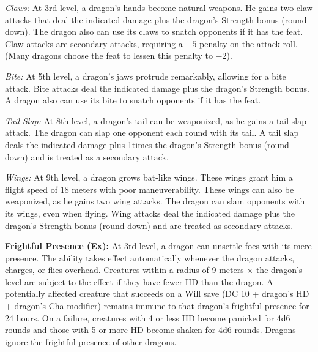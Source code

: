 {

\textit{Claws:} At 3rd level, a dragon's hands become natural weapons. He gains two claw attacks that deal the indicated damage plus \onehalf the dragon's Strength bonus (round down). The dragon also can use its claws to snatch opponents if it has the  feat. Claw attacks are secondary attacks, requiring a $-5$ penalty on the attack roll. (Many dragons choose the  feat to lessen this penalty to $-2$).

\textit{Bite:} At 5th level, a dragon's jaws protrude remarkably, allowing for a bite attack. Bite attacks deal the indicated damage plus the dragon's Strength bonus. A dragon also can use its bite to snatch opponents if it has the  feat.

\textit{Tail Slap:} At 8th level, a dragon's tail can be weaponized, as he gains a tail slap attack. The dragon can slap one opponent each round with its tail. A tail slap deals the indicated damage plus 1\onehalf times the dragon's Strength bonus (round down) and is treated as a secondary attack.

\textit{Wings:} At 9th level, a dragon grows bat-like wings. These wings grant him a flight speed of 18 meters with poor maneuverability. These wings can also be weaponized, as he gains two wing attacks. The dragon can slam opponents with its wings, even when flying. Wing attacks deal the indicated damage plus \onehalf the dragon's Strength bonus (round down) and are treated as secondary attacks.

\textbf{Frightful Presence (Ex):} At 3rd level, a dragon can unsettle foes with its mere presence. The ability takes effect automatically whenever the dragon attacks, charges, or flies overhead. Creatures within a radius of 9 meters $\times$ the dragon's level are subject to the effect if they have fewer HD than the dragon. A potentially affected creature that succeeds on a Will save (DC 10 + dragon's HD + dragon's Cha modifier) remains immune to that dragon's frightful presence for 24 hours. On a failure, creatures with 4 or less HD become panicked for 4d6 rounds and those with 5 or more HD become shaken for 4d6 rounds. Dragons ignore the frightful presence of other dragons.

}
